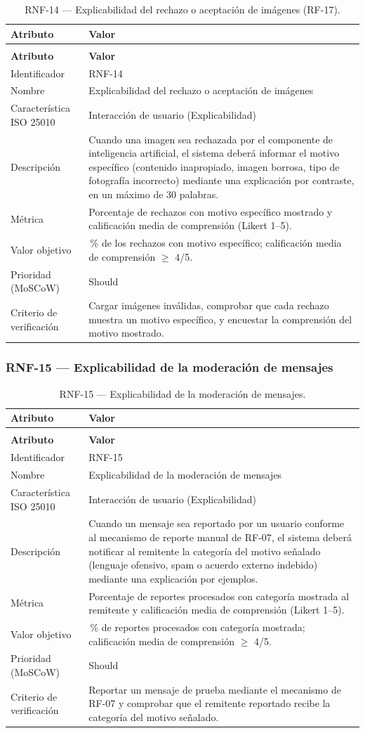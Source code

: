 \documentclass[journal,onecolumn]{IEEEtran}
\makeatletter
\newenvironment{atributos}[2]{%
	\small
	\begin{longtable}{@{}>{\raggedright\arraybackslash}p{4.2cm} >{\raggedright\arraybackslash}p{11.2cm}@{}}
		\caption{#2}\label{tab:#1}\\
		\toprule
		\textbf{Atributo} & \textbf{Valor} \\
		\midrule
		\endfirsthead
		\multicolumn{2}{@{}l}{\small\itshape (continuación)}\\
		\toprule
		\textbf{Atributo} & \textbf{Valor} \\
		\midrule
		\endhead
		\bottomrule
		\endlastfoot
	}{%
	\end{longtable}
	\normalsize
}
\makeatother
\begin{document}
	\begin{atributos}{RNF-14}{RNF-14 --- Explicabilidad del rechazo o aceptación de imágenes (RF-17).}
		Identificador & RNF-14 \\
		Nombre & Explicabilidad del rechazo o aceptación de imágenes \\
		Característica ISO 25010 & Interacción de usuario (Explicabilidad) \\
		Descripción & Cuando una imagen sea rechazada por el componente de inteligencia artificial, el sistema deberá informar el motivo específico (contenido inapropiado, imagen borrosa, tipo de fotografía incorrecto) mediante una explicación por contraste, en un máximo de 30 palabras. \\
		Métrica & Porcentaje de rechazos con motivo específico mostrado y calificación media de comprensión (Likert 1--5). \\
		Valor objetivo & 100\,\% de los rechazos con motivo específico; calificación media de comprensión $\geq$ 4/5. \\
		Prioridad (MoSCoW) & Should \\
		Criterio de verificación & Cargar imágenes inválidas, comprobar que cada rechazo muestra un motivo específico, y encuestar la comprensión del motivo mostrado. \\
	\end{atributos}
	
	\subsubsection{RNF-15 --- Explicabilidad de la moderación de mensajes}
	
	\begin{atributos}{RNF-15}{RNF-15 --- Explicabilidad de la moderación de mensajes.}
		Identificador & RNF-15 \\
		Nombre & Explicabilidad de la moderación de mensajes \\
		Característica ISO 25010 & Interacción de usuario (Explicabilidad) \\
		Descripción & Cuando un mensaje sea reportado por un usuario conforme al mecanismo de reporte manual de RF-07, el sistema deberá notificar al remitente la categoría del motivo señalado (lenguaje ofensivo, spam o acuerdo externo indebido) mediante una explicación por ejemplos. \\
		Métrica & Porcentaje de reportes procesados con categoría mostrada al remitente y calificación media de comprensión (Likert 1--5). \\
		Valor objetivo & 100\,\% de reportes procesados con categoría mostrada; calificación media de comprensión $\geq$ 4/5. \\
		Prioridad (MoSCoW) & Should \\
		Criterio de verificación & Reportar un mensaje de prueba mediante el mecanismo de RF-07 y comprobar que el remitente reportado recibe la categoría del motivo señalado. \\
	\end{atributos}
	
\end{document}
